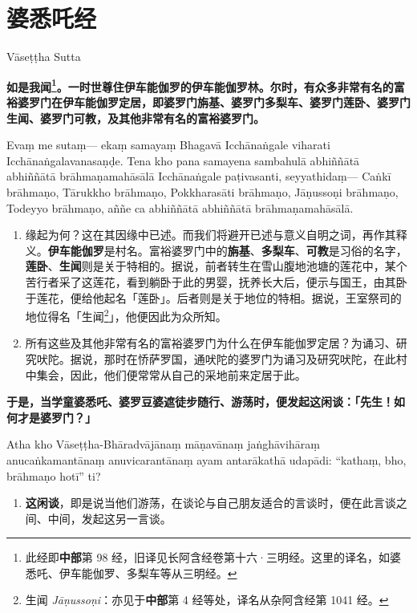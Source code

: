 \section{婆悉吒经}

\begin{center}Vāseṭṭha Sutta\end{center}\vspace{1em}

\textbf{如是我闻\footnote{此经即\textbf{中部}第 98 经，旧译见长阿含经卷第十六·三明经。这里的译名，如婆悉吒、伊车能伽罗、多梨车等从三明经。}。一时世尊住伊车能伽罗的伊车能伽罗林。尔时，有众多非常有名的富裕婆罗门在伊车能伽罗定居，即婆罗门旃基、婆罗门多梨车、婆罗门莲卧、婆罗门生闻、婆罗门可教，及其他非常有名的富裕婆罗门。}

Evaṃ me sutaṃ— ekaṃ samayaṃ Bhagavā Icchānaṅgale viharati Icchānaṅgalavanasaṇḍe. Tena kho pana samayena sambahulā abhiññātā abhiññātā brāhmaṇamahāsālā Icchānaṅgale paṭivasanti, seyyathidaṃ— Caṅkī brāhmaṇo, Tārukkho brāhmaṇo, Pokkharasāti brāhmaṇo, Jāṇussoṇi brāhmaṇo, Todeyyo brāhmaṇo, aññe ca abhiññātā abhiññātā brāhmaṇamahāsālā.

\begin{enumerate}\item 缘起为何？这在其因缘中已述。而我们将避开已述与意义自明之词，再作其释义。\textbf{伊车能伽罗}是村名。富裕婆罗门中的\textbf{旃基}、\textbf{多梨车}、\textbf{可教}是习俗的名字，\textbf{莲卧}、\textbf{生闻}则是关于特相的。据说，前者转生在雪山腹地池塘的莲花中，某个苦行者采了这莲花，看到躺卧于此的男婴，抚养长大后，便示与国王，由其卧于莲花，便给他起名「莲卧」。后者则是关于地位的特相。据说，王室祭司的地位得名「生闻\footnote{生闻 \textit{Jāṇussoṇi}：亦见于\textbf{中部}第 4 经等处，译名从杂阿含经第 1041 经。}」，他便因此为众所知。
\item 所有这些及其他非常有名的富裕婆罗门为什么在伊车能伽罗定居？为诵习、研究吠陀。据说，那时在㤭萨罗国，通吠陀的婆罗门为诵习及研究吠陀，在此村中集会，因此，他们便常常从自己的采地前来定居于此。\end{enumerate}

\textbf{于是，当学童婆悉吒、婆罗豆婆遮徒步随行、游荡时，便发起这闲谈：「先生！如何才是婆罗门？」}

Atha kho Vāseṭṭha-Bhāradvājānaṃ māṇavānaṃ jaṅghāvihāraṃ anucaṅkamantānaṃ anuvicarantānaṃ ayam antarākathā udapādi: “kathaṃ, bho, brāhmaṇo hotī” ti?

\begin{enumerate}\item \textbf{这闲谈}，即是说当他们游荡，在谈论与自己朋友适合的言谈时，便在此言谈之间、中间，发起这另一言谈。\end{enumerate}

